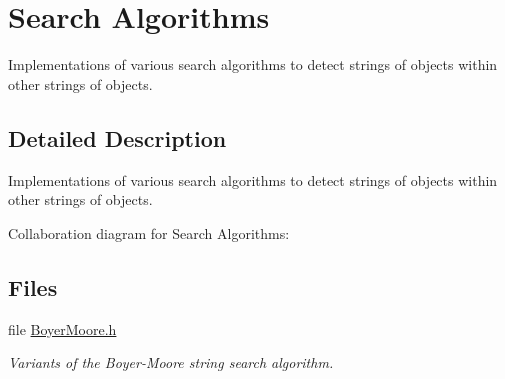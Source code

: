\hypertarget{group__search__utils}{}\section{Search Algorithms}
\label{group__search__utils}


Implementations of various search algorithms to detect strings of objects within other strings of objects.  




\subsection{Detailed Description}
Implementations of various search algorithms to detect strings of objects within other strings of objects. 

Collaboration diagram for Search Algorithms\+:
\subsection*{Files}
\begin{DoxyCompactItemize}
\item 
file \mbox{\hyperlink{BoyerMoore_8h}{Boyer\+Moore.\+h}}
\begin{DoxyCompactList}\small\item\em Variants of the Boyer-\/\+Moore string search algorithm. \end{DoxyCompactList}\end{DoxyCompactItemize}
